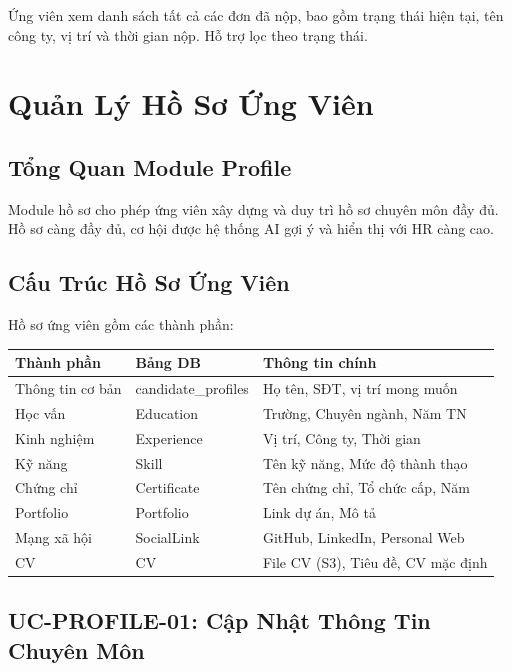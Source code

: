 \documentclass[12pt, a4paper]{report}
\begin{document}
Ứng viên xem danh sách tất cả các đơn đã nộp, bao gồm trạng thái hiện tại, tên công ty, vị trí và thời gian nộp. Hỗ trợ lọc theo trạng thái.

\chapter{Quản Lý Hồ Sơ Ứng Viên}

\section{Tổng Quan Module Profile}

Module hồ sơ cho phép ứng viên xây dựng và duy trì hồ sơ chuyên môn đầy đủ. Hồ sơ càng đầy đủ, cơ hội được hệ thống AI gợi ý và hiển thị với HR càng cao.

\section{Cấu Trúc Hồ Sơ Ứng Viên}

Hồ sơ ứng viên gồm các thành phần:

\begin{center}
\begin{tabular}{|p{4cm}|p{4cm}|p{6cm}|}
\hline
\textbf{Thành phần} & \textbf{Bảng DB} & \textbf{Thông tin chính} \\
\hline
Thông tin cơ bản & candidate\_profiles & Họ tên, SĐT, vị trí mong muốn \\
\hline
Học vấn & Education & Trường, Chuyên ngành, Năm TN \\
\hline
Kinh nghiệm & Experience & Vị trí, Công ty, Thời gian \\
\hline
Kỹ năng & Skill & Tên kỹ năng, Mức độ thành thạo \\
\hline
Chứng chỉ & Certificate & Tên chứng chỉ, Tổ chức cấp, Năm \\
\hline
Portfolio & Portfolio & Link dự án, Mô tả \\
\hline
Mạng xã hội & SocialLink & GitHub, LinkedIn, Personal Web \\
\hline
CV & CV & File CV (S3), Tiêu đề, CV mặc định \\
\hline
\end{tabular}
\end{center}

\section{UC-PROFILE-01: Cập Nhật Thông Tin Chuyên Môn}
\end{document}
